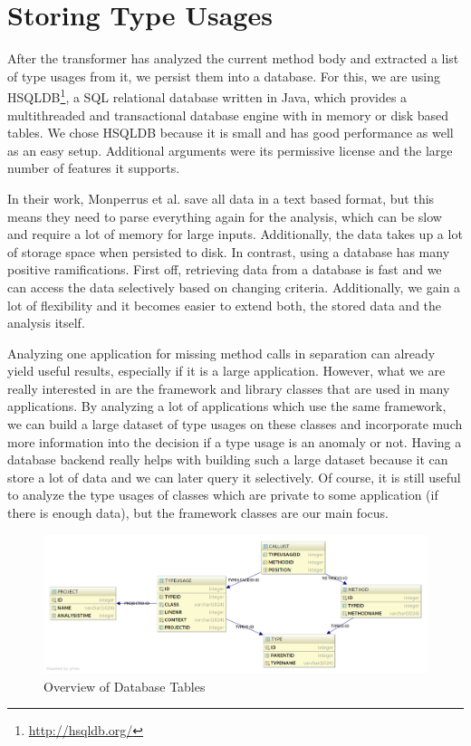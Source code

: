\section{Storing Type Usages}

After the transformer has analyzed the current method body and extracted a list of type usages from it, we persist them into a database.
For this, we are using HSQLDB\footnote{\url{http://hsqldb.org/}}, a SQL relational database written in Java, which provides a multithreaded and transactional database engine with in memory or disk based tables.
We chose HSQLDB because it is small and has good performance as well as an easy setup.
Additional arguments were its permissive license and the large number of features it supports.

In their work, Monperrus et al. save all data in a text based format, but this means they need to parse everything again for the analysis, which can be slow and require a lot of memory for large inputs.
Additionally, the data takes up a lot of storage space when persisted to disk.
In contrast, using a database has many positive ramifications.
First off, retrieving data from a database is fast and we can access the data selectively based on changing criteria.
Additionally, we gain a lot of flexibility and it becomes easier to extend both, the stored data and the analysis itself.

Analyzing one application for missing method calls in separation can already yield useful results, especially if it is a large application.
However, what we are really interested in are the framework and library classes that are used in many applications.
By analyzing a lot of applications which use the same framework, we can build a large dataset of type usages on these classes and incorporate much more information into the decision if a type usage is an anomaly or not.
Having a database backend really helps with building such a large dataset because it can store a lot of data and we can later query it selectively.
Of course, it is still useful to analyze the type usages of classes which are private to some application (if there is enough data), but the framework classes are our main focus.

\begin{figure}[t]
    \centering
    \includegraphics[width=\textwidth]{figures/database_layout-light}
    \caption{Overview of Database Tables}
    \label{fig:db_layout}
\end{figure}

